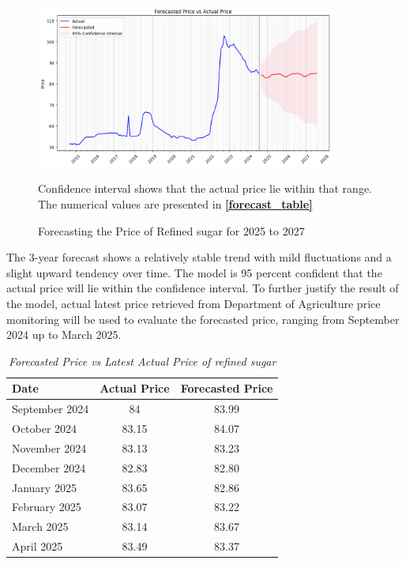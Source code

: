 \documentclass[11pt]{article}
\begin{document}
\begin{figure}[H]
    \caption{Forecasting the Price of Refined sugar for 2025 to 2027}
    \label{forecast}
    \centering
    \includegraphics[width = 0.88\textwidth]{forecasted_plot.png}
    
    Confidence interval shows that the actual price lie within that range. The numerical values are presented in  \textbf{\ref{forecast_table}}
\end{figure}

The 3-year forecast shows a relatively stable trend with mild fluctuations and a slight upward tendency over time. The model is 95 percent confident that the actual price will lie within the confidence interval. To further justify the result of the model, actual latest price retrieved from Department of Agriculture price monitoring will be used to evaluate the forecasted price, ranging from September 2024 up to March 2025. 

\begin{table}[H]
    \caption{\textit{Forecasted Price vs Latest Actual Price of refined sugar}}
    \label{super}
    \centering
    \begin{tabular}{lcc}
        \toprule
        Date & Actual Price & Forecasted Price  \\
        \midrule
        September 2024 & 84 &    83.99 \\
        October 2024   & 83.15 & 84.07  \\
        November 2024  & 83.13 & 83.23  \\
        December 2024  & 82.83 & 82.80  \\
        January 2025   & 83.65 & 82.86  \\
        February 2025  & 83.07 & 83.22  \\
        March 2025     & 83.14 & 83.67  \\
        April 2025     & 83.49 & 83.37  \\
        \bottomrule
    \end{tabular}
\end{table}
\end{document}
